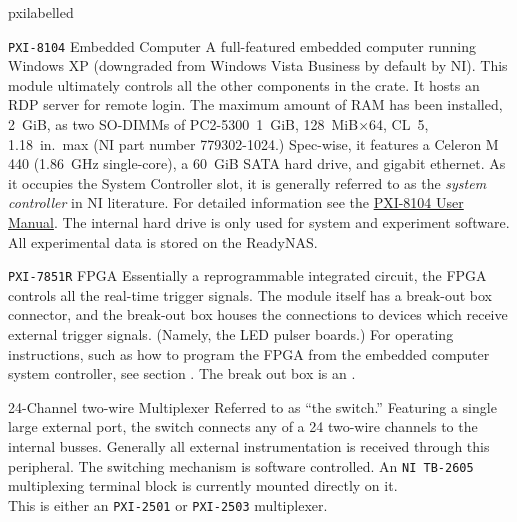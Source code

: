 \newcommand*{\pxilabelled}[1]{\hspace\labelsep \normalfont\bfseries #1}
\begin{labelled}{pxilabelled}

  \item[\pxislotone{} \texttt{PXI-8104}\hspace{.25em} Embedded Computer]
    A full-featured embedded computer running Windows XP (downgraded from Windows Vista Business by default by \gls{NI}).  This module ultimately controls all the other components in the crate.  It hosts an RDP server for remote login.  The maximum amount of RAM has been installed, 2~GiB, as two SO-DIMMs of PC2-5300~1~GiB, 128~MiB$\times$64, CL~5, 1.18~in.~max (\gls{NI} part number 779302-1024.)  Spec-wise, it features a Celeron M 440 (1.86~GHz single-core), a 60~GiB SATA hard drive, and gigabit ethernet.  As it occupies the \gls{System Controller} slot, it is generally referred to as the \textit{system controller} in \gls{NI} literature.  For detailed information see the \href{National Instruments Manuals/NI PXI-8104 User Manual}{PXI-8104 User Manual}.  The internal hard drive is only used for system and experiment software.  All experimental data is stored on the \gls{ReadyNAS}.  

  \item[\pxislottwo{} \texttt{PXI-7851R}\hspace{.25em} \gls{FPGA}]
    Essentially a reprogrammable integrated circuit, the FPGA controls all the real-time trigger signals.  The module itself has a break-out box connector, and the break-out box houses the connections to devices which receive external trigger signals.  (Namely, the LED pulser boards.)  For operating instructions, such as how to program the FPGA from the embedded computer system controller, see section .  The break out box is an .

  \item[\pxislotn{3} \texttt{\FIXME}\hspace{.25em} 24-Channel two-wire Multiplexer]
    Referred to as ``the switch.''  Featuring a single large external port, the switch connects any of a 24 two-wire channels to the internal busses.  Generally all external instrumentation is received through this peripheral.  The switching mechanism is software controlled.  An \texttt{NI TB-2605} multiplexing terminal block is currently mounted directly on it.\\\noindent
    \FIXME This is either an \texttt{PXI-2501} or \texttt{PXI-2503} multiplexer.


\end{labelled}
